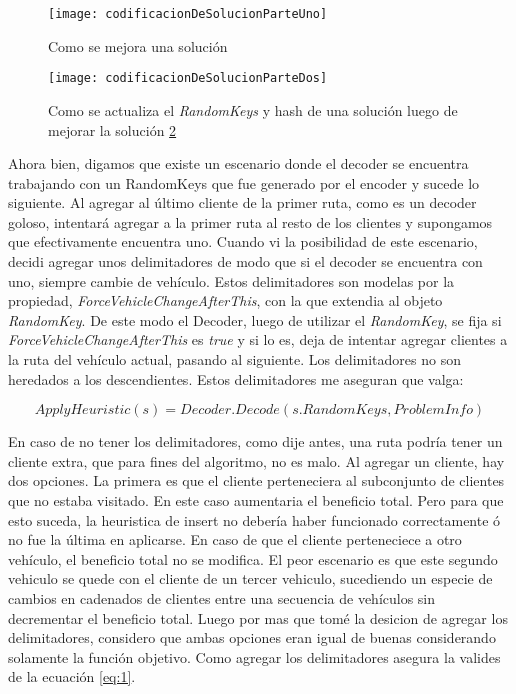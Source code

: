 \bigskip

\begin{figure}[h]
	\caption{Como se mejora una solución}
	\centering
	\texttt{[image: codificacionDeSolucionParteUno]}
	\label{fig:codificacionDeSolucionUno}
\end{figure}

\begin{figure}[h]
	\caption{Como se actualiza el \textit{RandomKeys} y hash de una solución luego de mejorar la solución \ref{fig:codificacionDeSolucionDos}}
	\centering
	\texttt{[image: codificacionDeSolucionParteDos]}
	\label{fig:codificacionDeSolucionDos}
\end{figure}

\bigskip

Ahora bien, digamos que existe un escenario donde el decoder se encuentra trabajando con un RandomKeys que fue generado por el encoder y sucede lo siguiente. Al agregar al último cliente de la primer ruta, como es un decoder goloso, intentará agregar a la primer ruta al resto de los clientes y supongamos que efectivamente encuentra uno. Cuando vi la posibilidad de este escenario, decidi agregar unos delimitadores de modo que si el decoder se encuentra con uno, siempre cambie de vehículo. Estos delimitadores son modelas por la propiedad, \textit{ForceVehicleChangeAfterThis}, con la que extendia al objeto \textit{RandomKey}. De este modo el Decoder, luego de utilizar el \textit{RandomKey}, se fija si \textit{ForceVehicleChangeAfterThis} es \textit{true} y si lo es, deja de intentar agregar clientes a la ruta del vehículo actual, pasando al siguiente. Los delimitadores no son heredados a los descendientes. Estos delimitadores me aseguran que valga: 

\begin{equation} \label{eq:1}
ApplyHeuristic(s) = Decoder.Decode(s.RandomKeys, ProblemInfo)
\end{equation}

\bigskip

En caso de no tener los delimitadores, como dije antes, una ruta podría tener un cliente extra, que para fines del algoritmo, no es malo. Al agregar un cliente, hay dos opciones. La primera es que el cliente perteneciera al subconjunto de clientes que no estaba visitado. En este caso aumentaria el beneficio total. Pero para que esto suceda, la heuristica de insert no debería haber funcionado correctamente ó no fue la última en aplicarse. En caso de que el cliente perteneciece a otro vehículo, el beneficio total no se modifica. El peor escenario es que este segundo vehiculo se quede con el cliente de un tercer vehiculo, sucediendo un especie de cambios en cadenados de clientes entre una secuencia de vehículos sin decrementar el beneficio total. Luego por mas que tomé la desicion de agregar los delimitadores, considero que ambas opciones eran igual de buenas considerando solamente la función objetivo. Como agregar los delimitadores asegura la valides de la ecuación \ref{eq:1}.

